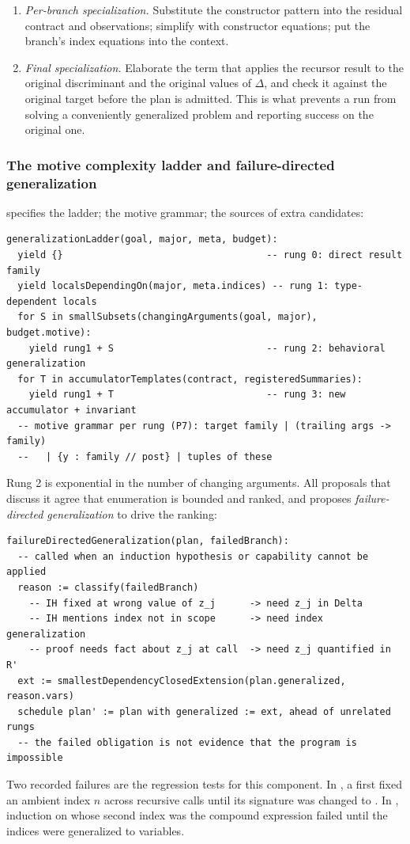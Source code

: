 \begin{enumerate}
\item \emph{Per-branch specialization.} Substitute the constructor pattern into the residual contract and observations; simplify with constructor equations; put the branch's index equations into the context.
\item \emph{Final specialization.} Elaborate the term that applies the recursor result to the original discriminant and the original values of $\Delta$, and check it against the original target before the plan is admitted. This is what prevents a run from solving a conveniently generalized problem and reporting success on the original one.
\end{enumerate}

\subsubsection{The motive complexity ladder and failure-directed generalization}\label{alg:rec-ladder}

 specifies the ladder;  the motive grammar;  the sources of extra candidates:
\begin{lstlisting}
generalizationLadder(goal, major, meta, budget):
  yield {}                                    -- rung 0: direct result family
  yield localsDependingOn(major, meta.indices) -- rung 1: type-dependent locals
  for S in smallSubsets(changingArguments(goal, major), budget.motive):
    yield rung1 + S                           -- rung 2: behavioral generalization
  for T in accumulatorTemplates(contract, registeredSummaries):
    yield rung1 + T                           -- rung 3: new accumulator + invariant
  -- motive grammar per rung (P7): target family | (trailing args -> family)
  --   | {y : family // post} | tuples of these
\end{lstlisting}
Rung 2 is exponential in the number of changing arguments. All proposals that discuss it agree that enumeration is bounded and ranked, and  proposes \emph{failure-directed generalization} to drive the ranking:
\begin{lstlisting}
failureDirectedGeneralization(plan, failedBranch):
  -- called when an induction hypothesis or capability cannot be applied
  reason := classify(failedBranch)
    -- IH fixed at wrong value of z_j      -> need z_j in Delta
    -- IH mentions index not in scope      -> need index generalization
    -- proof needs fact about z_j at call  -> need z_j quantified in R'
  ext := smallestDependencyClosedExtension(plan.generalized, reason.vars)
  schedule plan' := plan with generalized := ext, ahead of unrelated rungs
  -- the failed obligation is not evidence that the program is impossible
\end{lstlisting}
Two recorded failures are the regression tests for this component. In , a first  fixed an ambient index $n$ across recursive calls until its signature was changed to . In , induction on  whose second index was the compound expression  failed until the indices were generalized to variables.

